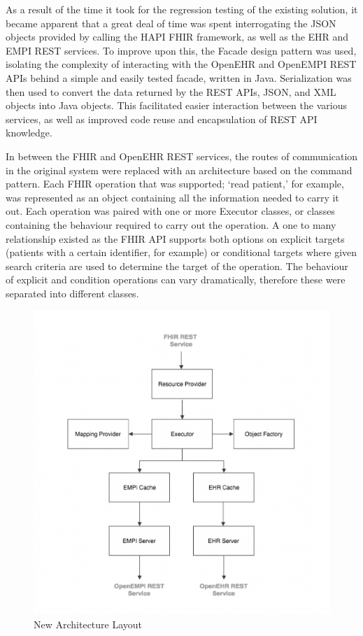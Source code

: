 \documentclass[sigconf]{acmart}
\begin{document}
As a result of the time it took for the regression testing of the existing solution, it became apparent that a great deal of time was spent interrogating the JSON objects provided by calling the HAPI FHIR framework, as well as the EHR and EMPI REST services. To improve upon this, the Facade design pattern was used, isolating the complexity of interacting with the OpenEHR and OpenEMPI REST APIs behind a simple and easily tested facade, written in Java. Serialization was then used to convert the data returned by the REST APIs, JSON, and XML objects into Java objects. This facilitated easier interaction between the various services, as well as improved code reuse and encapsulation of REST API knowledge.

In between the FHIR and OpenEHR REST services, the routes of communication in the original system were replaced with an architecture based on the command pattern. Each FHIR operation that was supported; ‘read patient,’ for example, was represented as an object containing all the information needed to carry it out. Each operation was paired with one or more Executor classes, or classes containing the behaviour required to carry out the operation. A one to many relationship existed as the FHIR API supports both options on explicit targets (patients with a certain identifier, for example) or conditional targets where given search criteria are used to determine the target of the operation. The behaviour of explicit and condition operations can vary dramatically, therefore these were separated into different classes.

\begin{figure}[!!h] 
	\centering 
	\includegraphics[width=0.8\columnwidth]{Figure2.png}
	\caption{New Architecture Layout} 
	\label{fig:new arch}
\end{figure}
\end{document}
